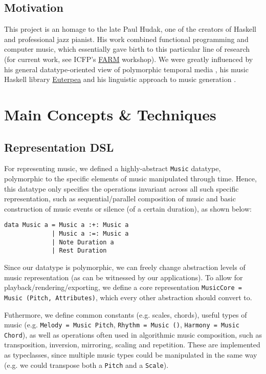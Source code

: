 \documentclass[11pt,a4paper]{article}
\newcommand{\icode}[1]{\texttt{#1}}
\begin{document}
\subsection{Motivation}
This project is an homage to the late Paul Hudak, one of the creators of Haskell and professional jazz pianist. His work combined functional programming and computer music, which essentially gave birth to this particular line of research (for current work, see ICFP's \href{https://icfp17.sigplan.org/track/farm-2017-papers}{FARM} workshop). We were greatly influenced by his general datatype-oriented view of polymorphic temporal media \cite{temporal}, his music Haskell library \href{http://euterpea.com}{Euterpea} and his linguistic approach to music generation \cite{hudak}.

\section{Main Concepts \& Techniques}

\subsection{Representation DSL}
For representing music, we defined a highly-abstract \icode{Music} datatype, polymorphic to the specific elements of music manipulated through time. Hence, this datatype only specifies the operations invariant across all such specific representation, such as sequential/parallel composition of music and basic construction of music events or silence (of a certain duration), as shown below:
\begin{center}\begin{minipage}{0.5\textwidth}\begin{verbatim}
data Music a = Music a :+: Music a
             | Music a :=: Music a
             | Note Duration a
             | Rest Duration
\end{verbatim}
\end{minipage}
\end{center}

Since our datatype is polymorphic, we can freely change abstraction levels of music representation (as can be witnessed by our applications). To allow for playback/rendering/exporting, we define a core representation \icode{MusicCore = Music (Pitch, Attributes)}, which every other abstraction should convert to.

Futhermore, we define common constants (e.g. scales, chords), useful types of music (e.g. \icode{Melody = Music Pitch}, \icode{Rhythm = Music ()}, \icode{Harmony = Music Chord}), as well as operations often used in algorithmic music composition, such as transposition, inversion, mirroring, scaling and repetition. These are implemented as typeclasses, since multiple music types could be manipulated in the same way (e.g. we could transpose both a \icode{Pitch} and a \icode{Scale}).
\end{document}
